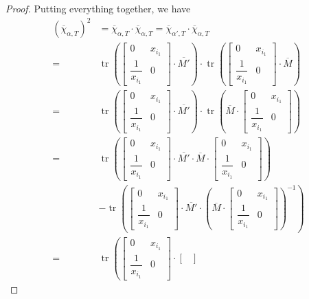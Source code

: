 \documentclass[10pt,a4paper]{amsart}
\numberwithin{equation}{section}
\theoremstyle{definition}
\begin{document}
\begin{proof}
 Putting everything together, we have
 \begin{align*}
 (\overline{\chi}_{\alpha, T})^2 &=\overline{\chi}_{\alpha, T}\cdot \overline{\chi}_{\alpha, T}=\overline{\chi}_{\alpha', T}\cdot \overline{\chi}_{\alpha, T}\\
={}&\operatorname{tr}\left(
\begin{bmatrix}
 0 & x_{i_1}\\
 \dfrac{1}{x_{i_1}} & 0
\end{bmatrix}
\cdot \overline{M'}\right)\cdot \operatorname{tr}\left(
\begin{bmatrix}
 0 & x_{i_1}\\
 \dfrac{1}{x_{i_1}} & 0
\end{bmatrix}
\cdot \overline{M}\right)\\
={}&\operatorname{tr}\left(
\begin{bmatrix}
 0 & x_{i_1}\\
 \dfrac{1}{x_{i_1}} & 0
\end{bmatrix}
\cdot \overline{M'}\right)\cdot \operatorname{tr}\left(\overline{M}\cdot
\begin{bmatrix}
 0 & x_{i_1}\\
 \dfrac{1}{x_{i_1}} & 0
\end{bmatrix}\right)\\
={}&\operatorname{tr}\left(
\begin{bmatrix}
 0 & x_{i_1}\\
 \dfrac{1}{x_{i_1}} & 0
\end{bmatrix}
\cdot \overline{M'}\cdot\overline{M}\cdot
\begin{bmatrix}
 0 & x_{i_1}\\
 \dfrac{1}{x_{i_1}} & 0
\end{bmatrix}\right)\\&-\operatorname{tr}\left(
\begin{bmatrix}
 0 & x_{i_1}\\
 \dfrac{1}{x_{i_1}} & 0
\end{bmatrix}
\cdot \overline{M'}\cdot \left(\overline{M}\cdot \begin{bmatrix}
 0 & x_{i_1}\\
 \dfrac{1}{x_{i_1}} & 0
\end{bmatrix}
\right)^{-1}\right)\\
={}&\operatorname{tr}\left(\begin{bmatrix}
 0 & x_{i_1}\\
 \dfrac{1}{x_{i_1}} & 0
\end{bmatrix}\cdot
\begin{bmatrix}

\end{bmatrix}
\end{align*}
\end{proof}
\end{document}
